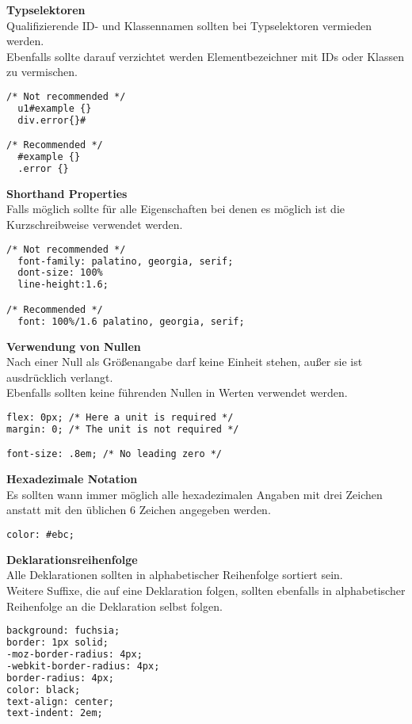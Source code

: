 \textbf{Typselektoren}\\
Qualifizierende ID- und Klassennamen sollten bei Typselektoren vermieden werden.\\ 
Ebenfalls sollte darauf verzichtet werden Elementbezeichner mit IDs oder Klassen zu vermischen.\\
\begin{lstlisting}[language = HTML, caption = Kennzeichnung von Typselektoren, label = type selectors]
/* Not recommended */
  u1#example {}
  div.error{}#

/* Recommended */
  #example {}
  .error {}
\end{lstlisting}

\textbf{Shorthand Properties}\\
Falls möglich sollte für alle Eigenschaften bei denen es möglich ist die Kurzschreibweise verwendet werden.

\begin{lstlisting}[language = HTML, caption = Shorthand Properties, label = short prop]
/* Not recommended */
  font-family: palatino, georgia, serif;
  dont-size: 100%
  line-height:1.6;

/* Recommended */
  font: 100%/1.6 palatino, georgia, serif;
\end{lstlisting}

\textbf{Verwendung von Nullen}\\
Nach einer Null als Größenangabe darf keine Einheit stehen, außer sie ist ausdrücklich verlangt.\\
Ebenfalls sollten keine führenden Nullen in Werten verwendet werden.
\begin{lstlisting}[language = HTML, caption = Verwendung von Nullen in Größenangaben, label = zeros]
flex: 0px; /* Here a unit is required */
margin: 0; /* The unit is not required */

font-size: .8em; /* No leading zero */
\end{lstlisting}

\textbf{Hexadezimale Notation}\\
Es sollten wann immer möglich alle hexadezimalen Angaben mit drei Zeichen anstatt mit den üblichen 6 Zeichen angegeben werden.\\
\begin{lstlisting}[language = HTML, caption = hexadezimale Angaben, label = hex]
color: #ebc;
\end{lstlisting}

\textbf{Deklarationsreihenfolge}\\
Alle Deklarationen sollten in alphabetischer Reihenfolge sortiert sein.\\
Weitere Suffixe, die auf eine Deklaration folgen, sollten ebenfalls in alphabetischer Reihenfolge an die Deklaration selbst folgen.
\begin{lstlisting}[language = HTML, caption = Sortierung von Deklarationen, label = decl]
background: fuchsia;
border: 1px solid;
-moz-border-radius: 4px;
-webkit-border-radius: 4px;
border-radius: 4px;
color: black;
text-align: center;
text-indent: 2em;
\end{lstlisting}

